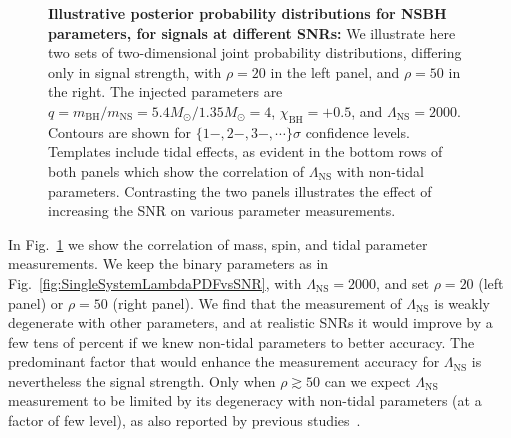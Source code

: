 \documentclass[aps,prd,amsmath,floats,floatfix, twocolumn,
superscriptaddress,nofootinbib,showpacs]{revtex4-1}
\newcommand{\lambdans}{\Lambda_\mathrm{NS}}
\newcommand{\chibh}{\chi_\mathrm{BH}}
\newcommand{\mbh}{m_\mathrm{BH}}
\newcommand{\mns}{m_\mathrm{NS}}
\begin{document}
\begin{appendix}
\begin{figure}
\caption{{\bf Illustrative posterior probability distributions for NSBH parameters,
for signals at different SNRs:}
We illustrate here two sets of two-dimensional joint probability distributions,
differing only in signal strength, with $\rho=20$ in the left panel, and
$\rho=50$ in the right. The injected parameters are 
$q = \mbh/\mns = 5.4M_\odot/1.35M_\odot = 4$, $\chibh=+0.5$, and 
$\lambdans=2000$. Contours are shown for $\{1-,2-,3-,\cdots\}\sigma$ confidence levels.
Templates include tidal effects, as evident in the bottom rows
of both panels which show the correlation of $\lambdans$ with non-tidal 
parameters. Contrasting the two panels illustrates the effect of increasing the
SNR on various parameter measurements.
}
\label{fig:SingleSystemLambda2DPDFs}
\end{figure}






In Fig.~\ref{fig:SingleSystemLambda2DPDFs} we show the correlation of
mass, spin, and tidal parameter measurements. We keep the binary parameters
as in Fig.~\ref{fig:SingleSystemLambdaPDFvsSNR}, with $\lambdans=2000$, and
set $\rho=20$ (left panel) or $\rho=50$ (right panel).
%
We find that the measurement of $\lambdans$ is weakly degenerate with
other parameters, and at realistic SNRs it would improve by a few tens of 
percent if we knew non-tidal parameters to better accuracy. The predominant
factor that would enhance the measurement accuracy for $\lambdans$ is 
nevertheless the signal strength. Only when $\rho\gtrsim 50$ can we
expect $\lambdans$ measurement to be limited by its degeneracy with 
non-tidal parameters (at a factor of few level), as also reported by previous
studies~\cite{Lackey:2013axa}.








\end{appendix}
\end{document}
